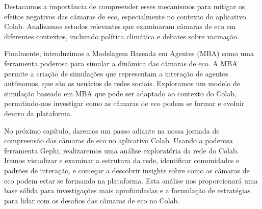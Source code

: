 Destacamos a importância de compreender esses mecanismos para mitigar os efeitos negativos das câmaras de eco, especialmente no contexto do aplicativo Colab. Analisamos estudos relevantes que examinaram câmaras de eco em diferentes contextos, incluindo política climática e debates sobre vacinação.

Finalmente, introduzimos a Modelagem Baseada em Agentes (MBA) como uma ferramenta poderosa para simular a dinâmica das câmaras de eco. A MBA permite a criação de simulações que representam a interação de agentes autônomos, que são os usuários de redes sociais. Exploramos um modelo de simulação baseado em MBA que pode ser adaptado ao contexto do Colab, permitindo-nos investigar como as câmaras de eco podem se formar e evoluir dentro da plataforma.

No próximo capítulo, daremos um passo adiante na nossa jornada de compreensão das câmaras de eco no aplicativo Colab. Usando a poderosa ferramenta Gephi, realizaremos uma análise exploratória da rede do Colab. Iremos visualizar e examinar a estrutura da rede, identificar comunidades e padrões de interação, e começar a descobrir insights sobre como as câmaras de eco podem estar se formando na plataforma. Esta análise nos proporcionará uma base sólida para investigações mais aprofundadas e a formulação de estratégias para lidar com os desafios das câmaras de eco no Colab.
